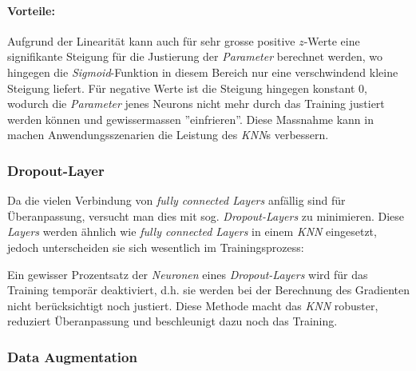 \paragraph{Vorteile:} Aufgrund der Linearität kann auch für sehr grosse positive $z$-Werte eine signifikante Steigung für die Justierung der \textit{Parameter} berechnet werden, wo hingegen die \textit{Sigmoid}-Funktion in diesem Bereich nur eine verschwindend kleine Steigung liefert. Für negative Werte ist die Steigung hingegen konstant 0, wodurch die \textit{Parameter} jenes Neurons nicht mehr durch das Training justiert werden können und gewissermassen ''einfrieren''. Diese Massnahme kann in machen Anwendungsszenarien die Leistung des \textit{KNN}s verbessern.

%
%

\subsubsection{Dropout-Layer}
Da die vielen Verbindung von \textit{fully connected Layers} anfällig sind für Überanpassung, versucht man dies mit sog. \textit{Dropout-Layers} zu minimieren. Diese \textit{Layers} werden ähnlich wie \textit{fully connected Layers} in einem \textit{KNN} eingesetzt, jedoch unterscheiden sie sich wesentlich im Trainingsprozess:

Ein gewisser Prozentsatz der \textit{Neuronen} eines \textit{Dropout-Layers} wird für das Training temporär deaktiviert, d.h. sie werden bei der Berechnung des Gradienten nicht berücksichtigt noch justiert. Diese Methode macht das \textit{KNN} robuster, reduziert Überanpassung und beschleunigt dazu noch das Training.

\subsubsection{Data Augmentation}

